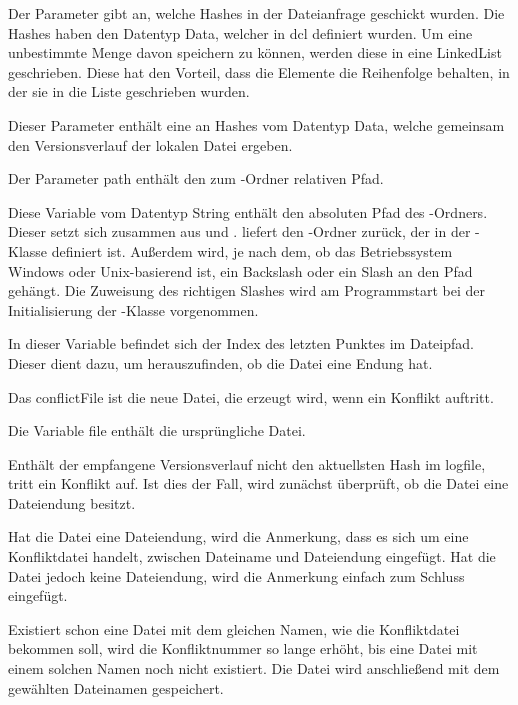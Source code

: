 \begin{description}
	 Der Parameter gibt an, welche Hashes in der Dateianfrage geschickt wurden. Die Hashes haben den Datentyp Data, welcher in \gls{dcl} definiert wurden. Um eine unbestimmte Menge davon speichern zu können, werden diese in eine LinkedList geschrieben. Diese hat den Vorteil, dass die Elemente die Reihenfolge behalten, in der sie in die Liste geschrieben wurden.
	
	 Dieser Parameter enthält eine  an Hashes vom Datentyp Data, welche gemeinsam den Versionsverlauf der lokalen Datei ergeben. 
	
	 Der Parameter path enthält den zum \sblit-Ordner relativen Pfad.
	
	 Diese Variable vom Datentyp String enthält den absoluten Pfad des \sblit-Ordners. Dieser setzt sich zusammen aus  und .  liefert den \sblit-Ordner zurück, der in der -Klasse definiert ist. Außerdem wird, je nach dem, ob das Betriebssystem Windows oder Unix-basierend ist, ein Backslash oder ein Slash an den Pfad gehängt. Die Zuweisung des richtigen Slashes wird am Programmstart bei der Initialisierung der -Klasse vorgenommen.

	 In dieser Variable befindet sich der Index des letzten Punktes im Dateipfad. Dieser dient dazu, um herauszufinden, ob die Datei eine Endung hat.
	
	 Das conflictFile ist die neue Datei, die erzeugt wird, wenn ein Konflikt auftritt.
	
	 Die Variable file enthält die ursprüngliche Datei.
\end{description}
Enthält der empfangene Versionsverlauf nicht den aktuellsten Hash im \gls{logfile}, tritt ein Konflikt auf. Ist dies der Fall, wird zunächst überprüft, ob die Datei eine Dateiendung besitzt.

Hat die Datei eine Dateiendung, wird die Anmerkung, dass es sich um eine Konfliktdatei handelt, zwischen Dateiname und Dateiendung eingefügt. Hat die Datei jedoch keine Dateiendung, wird die Anmerkung einfach zum Schluss eingefügt.

Existiert schon eine Datei mit dem gleichen Namen, wie die Konfliktdatei bekommen soll, wird die Konfliktnummer so lange erhöht, bis eine Datei mit einem solchen Namen noch nicht existiert. Die Datei wird anschließend mit dem gewählten Dateinamen gespeichert.
